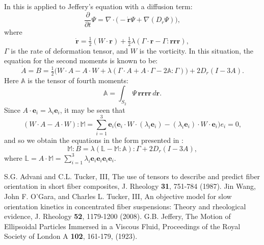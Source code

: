 \documentclass{amsart}
\newcommand{\p}{{\boldsymbol r}}
\newcommand{\e}{{\boldsymbol e}}
\begin{document}
In \cite{rsc} this is applied to Jeffery's equation \cite{jeffery} with a diffusion term:
$$ \frac\partial{\partial t}\Psi = \nabla\cdot\bigl(-\dot\p \Psi + \nabla(D_r \Psi)\bigr),$$
where
$$ \dot\p = \tfrac12(W\cdot\p) + \tfrac12\lambda(\Gamma \cdot\p - \Gamma:\p\p\p) , $$
$\Gamma$ is the rate of deformation tensor, and $W$ is the vorticity.  In this situation, the equation for the second moments is known \cite{advani} to be:
$$ \dot A = B = \tfrac12\bigl(W\cdot A-A\cdot W+\lambda(\Gamma\cdot A+A\cdot\Gamma-2\mathbb A:\Gamma)\bigr) + 2 D_r (I-3A) .$$
Here $\mathbb A$ is the tensor of fourth moments:
$$ \mathbb A = \int_{S_2} \Psi \,\p\p\p\p \, d\p .$$
Since $A\cdot\e_i=\lambda_i\e_i$, it may be seen that
$$ (W\cdot A-A\cdot W):\mathbb M = \sum_{i=1}^3 \e_i\bigl(\e_i\cdot W\cdot(\lambda_i\e_i)-(\lambda_i\e_i)\cdot W\cdot\e_i\bigr)e_i = 0 ,$$
and so we obtain the equations in the form presented in \cite{rsc}:
$$ \mathbb M:B = \lambda(\mathbb L - \mathbb M:\mathbb A):\Gamma + 2 D_r(I-3A) ,$$
where $\mathbb L = A\cdot\mathbb M = \sum_{i=1}^3 \lambda_i\e_i\e_i\e_i\e_i$.

\begin{thebibliography}{99}
S.G. Advani and C.L. Tucker, III, The use of tensors to describe and predict fiber orientation in short fiber composites, J. Rheology {\bf 31}, 751-784 (1987).
Jin Wang, John F. O'Gara, and Charles L. Tucker, III, An objective model for slow orientation kinetics in concentrated fiber suspensions: Theory and rheological evidence, J. Rheology {\bf 52}, 1179-1200 (2008).
G.B. Jeffery, The Motion of Ellipsoidal Particles Immersed in a Viscous Fluid, Proceedings of the Royal Society of London A {\bf 102}, 161-179, (1923).
\end{thebibliography}
\end{document}
